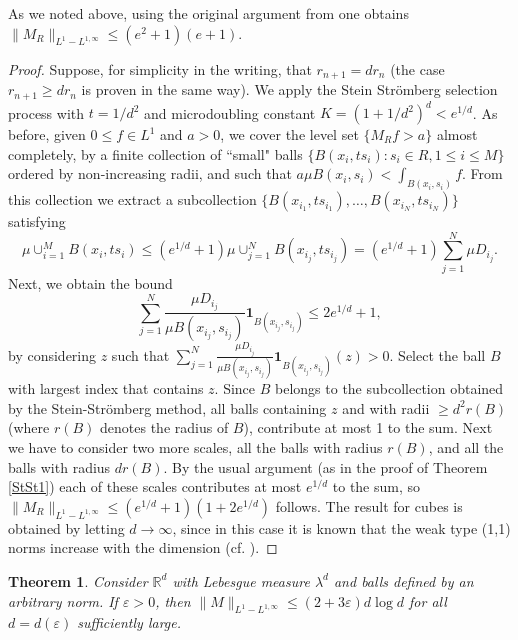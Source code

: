 \documentclass[12pt]{amsart}
\newtheorem{theorem}{Theorem}[section]
\theoremstyle{definition}
\theoremstyle{parrafo}
\begin{document}
As we noted above, using the original argument from
\cite{StSt} one obtains  $\|M_R\|_{L^1-L^{1,\infty}} \le (e^2 + 1) (e + 1)$.

 \begin{proof} Suppose, for simplicity in the writing, that $r_{n + 1} = d r_n$
(the case  $r_{n + 1} \ge  d r_n$ is proven in the same way).  We  apply the
 Stein Str\"omberg selection process  with $t =1/d^2$ and microdoubling constant $K = (1 + 1/d^2)^{d}
 < e^{1/d}$. 
As before, given $0 \le f \in L^1$ and $a >0$, 
we cover the  level set  $\{M_R f > a\}$  almost completely,  by a finite collection of  ``small" balls
 $\{B(x_i, t s_i): s_i \in R, 1 \le i \le M\}$  ordered by non-increasing radii,
 and such that $a \mu B(x_i,  s_i) < \int_{B(x_i,  s_i)} f$.
 From this collection  we extract a subcollection 
$\{B(x_{i_1}, t s_{i_1}), \dots, B(x_{i_N}, t s_{i_N})\}$
 satisfying 
$$
\mu \cup_{i= 1}^M B(x_i, t s_i)
\le 
(e^{1/d} + 1) \mu \cup_{j=1}^N   B(x_{i_j}, t s_{i_j})
=
(e^{1/d} + 1) \sum_{j=1}^N \mu D_{i_j}. 
$$
Next, we obtain the bound
$$
\sum_{j=1}^N \frac{\mu D_{i_j}}{\mu B(x_{i_j}, s_{i_j})}\mathbf{1}_{B(x_{i_j}, s_{i_j})}
\le 2  e^{1/d} + 1,
$$
by considering $z$ such that
 $\sum_{j=1}^N \frac{\mu D_{i_j}}{\mu B(x_{i_j}, s_{i_j})}\mathbf{1}_{B(x_{i_j}, s_{i_j})}(z) > 0$.
Select the ball $B$   with largest index that contains $z$. Since $B$ belongs to the subcollection
obtained by the Stein-Str\"omberg method, all balls containing $z$ and  with radii
$\ge d^2 r(B)$ (where $r(B)$ denotes the radius of $B$), contribute at most 1 to the sum. 
Next we have to consider two more scales, all the balls with radius $r(B)$,
and all the balls with radius $d r(B)$. By the usual argument (as in the proof of Theorem \ref{StSt1})  each of these scales contributes
at most $e^{1/d}$ to the sum, so $\|M_R\|_{L^1-L^{1,\infty}} \le (e^{1/d} + 1) (1 + 2  e^{1/d})$ follows.
 The result for
 cubes is obtained by letting $d\to\infty$, since in this case it is known that 
 the weak type (1,1) norms increase with the dimension (cf. \cite[Theorem 2]{AV}).
  \end{proof}
  


\begin{theorem}\label{SS2Lebesgue}  Consider $\mathbb{R}^d$ with Lebesgue measure
$\lambda^d$ and balls defined by an arbitrary norm. If  $\varepsilon > 0$, 
 then  
$\|M\|_{L^1-L^{1,\infty}} \le (2 +  3 \varepsilon) d \log d$  for all $d = d(\varepsilon)$ sufficiently large.
\end{theorem}
\end{document}
